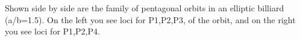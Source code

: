 Shown side by side are the family of pentagonal orbits in an elliptic billiard (a/b=1.5). On the left you see loci for P1,P2,P3, of the orbit, and on the right you see loci for P1,P2,P4.